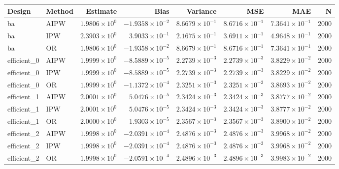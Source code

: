 \begin{table}[ht]
\centering
\begin{tabular}{llrrrrrr}
  \toprule
Design & Method & Estimate & Bias & Variance & MSE & MAE & N \\ 
  \midrule
ba & AIPW & $1.9806 \times 10^{0}$ & $-1.9358 \times 10^{-2}$ & $8.6679 \times 10^{-1}$ & $8.6716 \times 10^{-1}$ & $7.3641 \times 10^{-1}$ & 2000 \\ 
  ba & IPW & $2.3903 \times 10^{0}$ & $3.9033 \times 10^{-1}$ & $2.1675 \times 10^{-1}$ & $3.6911 \times 10^{-1}$ & $4.9648 \times 10^{-1}$ & 2000 \\ 
  ba & OR & $1.9806 \times 10^{0}$ & $-1.9358 \times 10^{-2}$ & $8.6679 \times 10^{-1}$ & $8.6716 \times 10^{-1}$ & $7.3641 \times 10^{-1}$ & 2000 \\ 
   \midrule
efficient\_0 & AIPW & $1.9999 \times 10^{0}$ & $-8.5889 \times 10^{-5}$ & $2.2739 \times 10^{-3}$ & $2.2739 \times 10^{-3}$ & $3.8229 \times 10^{-2}$ & 2000 \\ 
  efficient\_0 & IPW & $1.9999 \times 10^{0}$ & $-8.5889 \times 10^{-5}$ & $2.2739 \times 10^{-3}$ & $2.2739 \times 10^{-3}$ & $3.8229 \times 10^{-2}$ & 2000 \\ 
  efficient\_0 & OR & $1.9999 \times 10^{0}$ & $-1.1372 \times 10^{-4}$ & $2.3251 \times 10^{-3}$ & $2.3251 \times 10^{-3}$ & $3.8693 \times 10^{-2}$ & 2000 \\ 
   \midrule
efficient\_1 & AIPW & $2.0001 \times 10^{0}$ & $5.0476 \times 10^{-5}$ & $2.3424 \times 10^{-3}$ & $2.3424 \times 10^{-3}$ & $3.8777 \times 10^{-2}$ & 2000 \\ 
  efficient\_1 & IPW & $2.0001 \times 10^{0}$ & $5.0476 \times 10^{-5}$ & $2.3424 \times 10^{-3}$ & $2.3424 \times 10^{-3}$ & $3.8777 \times 10^{-2}$ & 2000 \\ 
  efficient\_1 & OR & $2.0000 \times 10^{0}$ & $1.9303 \times 10^{-5}$ & $2.3567 \times 10^{-3}$ & $2.3567 \times 10^{-3}$ & $3.8900 \times 10^{-2}$ & 2000 \\ 
   \midrule
efficient\_2 & AIPW & $1.9998 \times 10^{0}$ & $-2.0391 \times 10^{-4}$ & $2.4876 \times 10^{-3}$ & $2.4876 \times 10^{-3}$ & $3.9968 \times 10^{-2}$ & 2000 \\ 
  efficient\_2 & IPW & $1.9998 \times 10^{0}$ & $-2.0391 \times 10^{-4}$ & $2.4876 \times 10^{-3}$ & $2.4876 \times 10^{-3}$ & $3.9968 \times 10^{-2}$ & 2000 \\ 
  efficient\_2 & OR & $1.9998 \times 10^{0}$ & $-2.0591 \times 10^{-4}$ & $2.4896 \times 10^{-3}$ & $2.4896 \times 10^{-3}$ & $3.9983 \times 10^{-2}$ & 2000 \\ 

\end{tabular}
\end{table}
